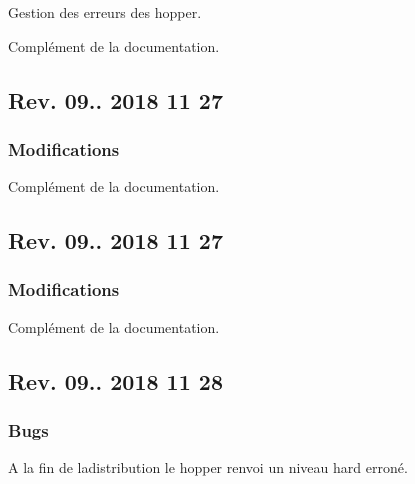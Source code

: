 \begin{DoxyItemize}
\item Gestion des erreurs des hopper.
\item Complément de la documentation.
\end{DoxyItemize}

\subsection*{Rev. 09.. 2018 11 27~\newline
}

\subsubsection*{Modifications}


\begin{DoxyItemize}
\item Complément de la documentation.
\end{DoxyItemize}

\subsection*{Rev. 09.. 2018 11 27~\newline
 }

\subsubsection*{Modifications}


\begin{DoxyItemize}
\item Complément de la documentation.
\end{DoxyItemize}

\subsection*{Rev. 09.. 2018 11 28~\newline
 }

\subsubsection*{Bugs}


\begin{DoxyItemize}
\item A la fin de ladistribution le hopper renvoi un niveau hard erroné.
\end{DoxyItemize}


